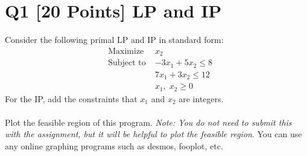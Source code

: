 \documentclass[10pt]{article}
\begin{document}
\section*{Q1 [20 Points] LP and IP}
Consider the following primal LP and IP in standard form:
\begin{align*}
    &\text{Maximize} \; &x_2\\
    &\text{Subject to} \; &-3x_1 + 5x_2 \leq 8\\
                        & &7x_1 + 3x_2 \leq 12\\
                        & &x_1, \; x_2 \geq 0
\end{align*}
For the IP, add the constraints that $x_1$ and $x_2$ are integers.\\
\\
Plot the feasible region of this program. \textit{Note: You do not need to submit this with the assignment, but it will be helpful to plot the feasible region}. You can use any online graphing programs such as
desmos, fooplot, etc.
\end{document}
